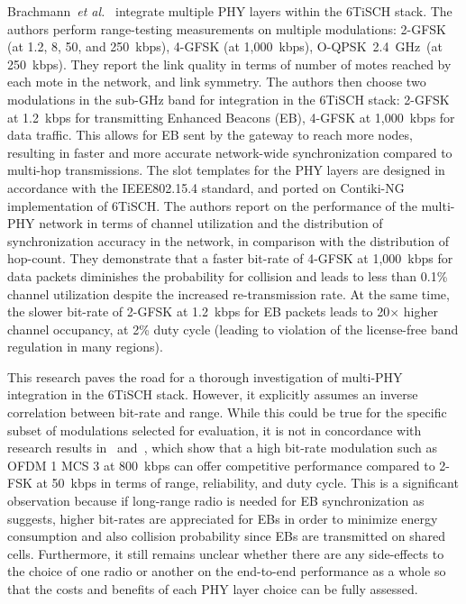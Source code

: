 \documentclass[sensors,article,submit,moreauthors,pdftex]{Definitions/mdpi}
\newcommand{\oqpsk}         {O-QPSK~2.4~GHz}
\newcommand{\etal}          {\textit{et al.}}
\begin{document}
Brachmann~\etal~\cite{brachmann19ieee} integrate multiple PHY layers within the 6TiSCH stack.
The authors perform range-testing measurements on multiple modulations:
     2-GFSK (at 1.2, 8, 50, and 250~kbps),
     4-GFSK (at 1,000~kbps),
     \oqpsk\ (at   250~kbps). 
They report the link quality in terms of number of motes reached by each mote in the network, and link symmetry.
The authors then choose two modulations in the sub-GHz band for integration in the 6TiSCH stack:
    2-GFSK at 1.2~kbps for transmitting Enhanced Beacons (EB),
    4-GFSK at 1,000~kbps for data traffic. 
This allows for EB sent by the gateway to reach more nodes, resulting in faster and more accurate network-wide synchronization compared to multi-hop transmissions. 
The slot templates for the PHY layers are designed in accordance with the IEEE802.15.4 standard,
    and ported on Contiki-NG implementation of 6TiSCH. 
The authors report on the performance of the multi-PHY network in terms of channel utilization and the distribution of synchronization accuracy in the network, in comparison with the distribution of hop-count. 
They demonstrate that a faster bit-rate of 4-GFSK at 1,000~kbps for data packets diminishes the probability for collision and leads to less than 0.1\% channel utilization despite the increased re-transmission rate.
At the same time, the slower bit-rate of 2-GFSK at 1.2~kbps for EB packets leads to 20$\times$ higher channel occupancy,
    at 2\% duty cycle (leading to violation of the license-free band regulation in many regions). 

This research paves the road for a thorough investigation of multi-PHY integration in the 6TiSCH stack.
However, it explicitly assumes an inverse correlation between bit-rate and range.
While this could be true for the specific subset of modulations selected for evaluation, it is not in concordance with research results in~\cite{munoz18overview} and~\cite{munoz18evaluation}, which show that a high bit-rate modulation such as OFDM 1 MCS 3 at 800~kbps can offer competitive performance compared to 2-FSK at 50~kbps in terms of range, reliability, and duty cycle. 
This is a significant observation because if long-range radio is needed for EB synchronization as~\cite{brachmann19ieee} suggests, higher bit-rates are appreciated for EBs in order to minimize energy consumption and also collision probability since EBs are transmitted on shared cells. 
Furthermore, it still remains unclear whether there are any side-effects to the choice of one radio or another  on the end-to-end performance as a whole so that the costs and benefits of each PHY layer choice can be fully assessed.
\end{document}
